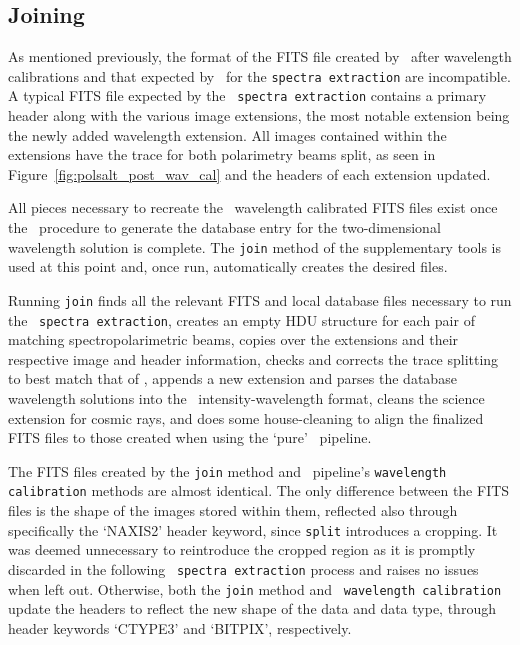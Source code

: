 \subsection{Joining}



As mentioned previously, the format of the \gls{FITS} file created by \iraf\ after wavelength calibrations and that expected by \polsalt\ for the \texttt{spectra extraction} are incompatible. A typical \gls{FITS} file expected by the \polsalt\ \texttt{spectra extraction} contains a primary header along with the various image extensions, the most notable extension being the newly added wavelength extension. All images contained within the extensions have the trace for both polarimetry beams split, as seen in Figure~\ref{fig:polsalt_post_wav_cal} and the headers of each extension updated.

All pieces necessary to recreate the \polsalt\ wavelength calibrated \gls{FITS} files exist once the \iraf\ procedure to generate the database entry for the two-dimensional wavelength solution is complete. The \texttt{join} method of the supplementary tools is used at this point and, once run, automatically creates the desired files.

Running \texttt{join} finds all the relevant \gls{FITS} and local database files necessary to run the \polsalt\ \texttt{spectra extraction}, creates an empty \gls{HDU} structure for each pair of matching spectropolarimetric beams, copies over the extensions and their respective image and header information, checks and corrects the trace splitting to best match that of \polsalt, appends a new extension and parses the database wavelength solutions into the \polsalt\ intensity-wavelength format, cleans the science extension for cosmic rays, and does some house-cleaning to align the finalized \gls{FITS} files to those created when using the `pure' \polsalt\ pipeline.

The \gls{FITS} files created by the \texttt{join} method and \polsalt\ pipeline's \texttt{wavelength calibration} methods are almost identical. The only difference between the \gls{FITS} files is the shape of the images stored within them, reflected also through specifically the `NAXIS2' header keyword, since \texttt{split} introduces a cropping. It was deemed unnecessary to reintroduce the cropped region as it is promptly discarded in the following \polsalt\ \texttt{spectra extraction} process and raises no issues when left out. Otherwise, both the \texttt{join} method and \polsalt\ \texttt{wavelength calibration} update the headers to reflect the new shape of the data and data type, through header keywords `CTYPE3' and `BITPIX', respectively.

